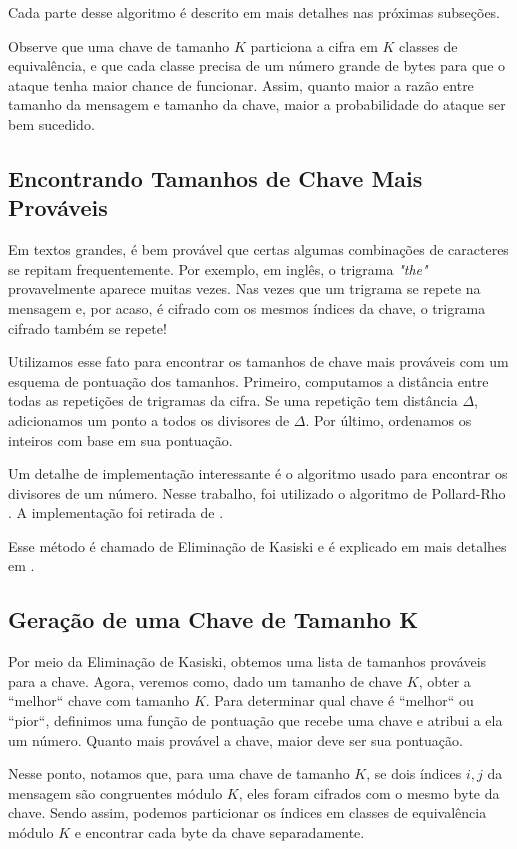 \documentclass[conference]{IEEEtran}
\begin{document}
Cada parte desse algoritmo é descrito em mais detalhes nas próximas subseções.  

Observe que uma chave de tamanho $K$ particiona a cifra em $K$ classes de
equivalência, e que cada classe precisa de um número grande de bytes para que o
ataque tenha maior chance de funcionar. Assim, quanto maior a razão entre
tamanho da mensagem e tamanho da chave, maior a probabilidade do ataque ser bem
sucedido.

\subsection{Encontrando Tamanhos de Chave Mais Prováveis}
\label{sec:tamanhos}

Em textos grandes, é bem provável que certas algumas combinações de caracteres
se repitam frequentemente. Por exemplo, em inglês, o trigrama \textit{"the"}
provavelmente aparece muitas vezes. Nas vezes que um trigrama se repete na
mensagem e, por acaso, é cifrado com os mesmos índices da chave, o trigrama
cifrado também se repete!

Utilizamos esse fato para encontrar os tamanhos de chave mais prováveis com um
esquema de pontuação dos tamanhos. Primeiro, computamos a distância entre todas
as repetições de trigramas da cifra. Se uma repetição tem distância $\Delta $,
adicionamos um ponto a todos os divisores de $\Delta $. Por último, ordenamos os
inteiros com base em sua pontuação.

Um detalhe de implementação interessante é o algoritmo usado para encontrar os
divisores de um número. Nesse trabalho, foi utilizado o algoritmo de Pollard-Rho
\cite{pollard-rho}. A implementação foi retirada de \cite{pollard-rho-tiago}.

Esse método é chamado de Eliminação de Kasiski e é explicado em mais detalhes em
\cite{kasiski}.

\subsection{Geração de uma Chave de Tamanho K}
\label{sec:pontuacao}
Por meio da Eliminação de Kasiski, obtemos uma lista de tamanhos prováveis para
a chave. Agora, veremos como, dado um tamanho de chave $K$, obter a ``melhor``
chave com tamanho $K$. Para determinar qual chave é ``melhor`` ou ``pior``,
definimos uma função de pontuação que recebe uma chave e atribui a ela um
número. Quanto mais provável a chave, maior deve ser sua pontuação. 

Nesse ponto, notamos que, para uma chave de tamanho $K$, se dois índices $i, j$ da
mensagem são congruentes módulo $K$, eles foram cifrados com o mesmo byte da
chave. Sendo assim, podemos particionar os índices em classes de equivalência
módulo $K$ e encontrar cada byte da chave separadamente.
\end{document}
